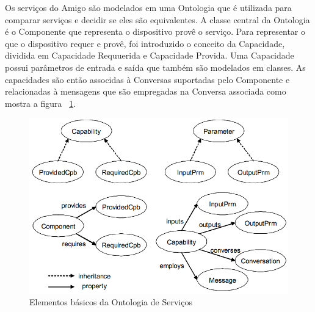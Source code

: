 Os serviços do Amigo são modelados em uma Ontologia que é utilizada para comparar serviços e decidir se eles são equivalentes. A classe central da Ontologia é o Componente que representa o dispositivo provê o serviço. Para representar o que o dispositivo requer e provê, foi introduzido o conceito da Capacidade, dividida em Capacidade Requuerida e Capacidade Provida. Uma Capacidade possui parâmetros de entrada e saída que também são modelados em classes. As capacidades são então associdas à Conversas suportadas pelo Componente e relacionadas à mensagens que são empregadas na Conversa associada como mostra a figura ~\ref{fig:amigoServiceOntology}.

\begin{figure}[ht]
\center
\includegraphics[scale=0.5]{imagens/amigo-ontology}
\caption{Elementos básicos da Ontologia de Serviços~\cite{amigoCore}}
\label{fig:amigoServiceOntology}
\end{figure}

